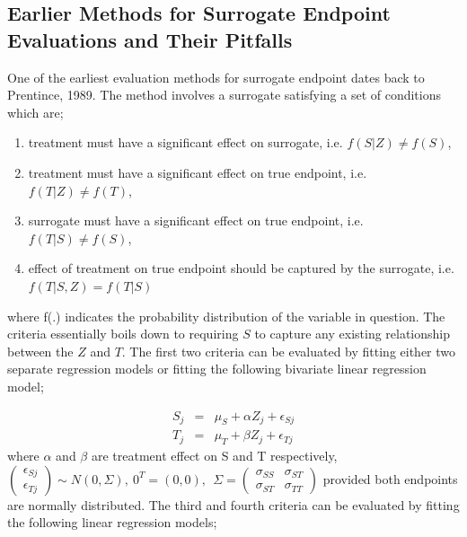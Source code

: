 \documentclass[a4paper,12pt]{article}
\begin{document}
	\subsection{Earlier Methods for Surrogate Endpoint Evaluations and Their Pitfalls}
	One of the earliest evaluation methods for surrogate endpoint dates back to Prentince, 1989\citep{prentice1989,surrogate1,surrogate2}. The method involves a surrogate satisfying a set of conditions which are;
	\begin{enumerate}
		\item treatment must have a significant effect on surrogate, i.e. $f(S|Z) \neq f(S)$,
		\item treatment must have a significant effect on true endpoint, i.e. $f(T|Z) \neq f(T)$,
		\item surrogate must have a significant effect on true endpoint, i.e. $f(T|S) \neq f(S)$,
		\item effect of treatment on true endpoint should be captured by the surrogate, i.e. $f(T|S,Z) = f(T|S)$ 
	\end{enumerate}
	where f(.) indicates the probability distribution of the variable in question. The criteria essentially boils down to requiring $S$ to capture any existing relationship between the $Z$ and $T$\citep{Degruttola}. The first two criteria can be evaluated by fitting either two separate regression models or fitting the following bivariate linear regression model;
	
	\begin{eqnarray}\label{jmodel}
	S_j &=& \mu_S + \alpha Z_j + \epsilon_{Sj}\\
	T_j &=& \mu_T + \beta Z_j + \epsilon_{Tj}
	\end{eqnarray}
	where $\alpha$ and $\beta$ are treatment effect on S and T respectively, $\left(\begin{array}{c}
	\epsilon_{Sj}\\
	\epsilon_{Tj}
	\end{array}\right) \sim N(0, \Sigma), \ 0^T = (0,0), \ \ \Sigma = \left(\begin{array}{cc}
	\sigma_{SS} & \sigma_{ST}\\
	\sigma_{ST} & \sigma_{TT}
	\end{array} \right)$ provided both endpoints are normally distributed\citep{buyseM,surrogate1}. The third and fourth criteria can be evaluated by fitting the following linear regression models;
	
\end{document}
